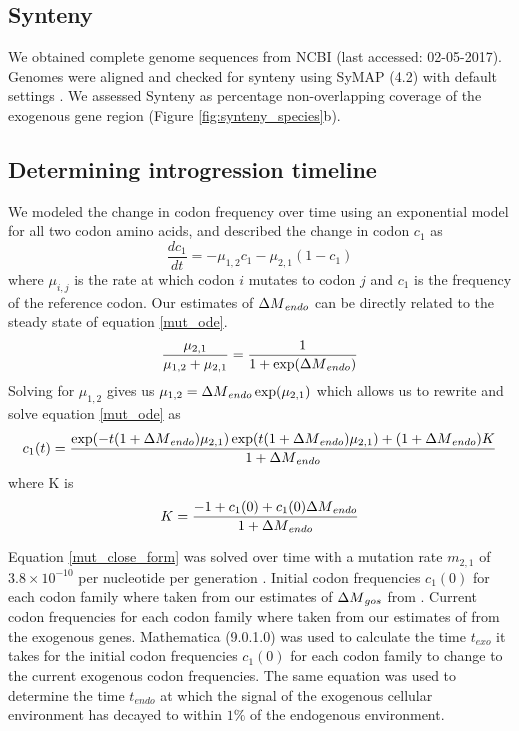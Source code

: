 \documentclass[12pt]{article}
\begin{document}
\subsection*{Synteny}
We obtained complete genome sequences from NCBI (last accessed: 02-05-2017).
Genomes were aligned and checked for synteny using SyMAP (4.2) with default settings \citep{soderlund2006, soderlund2011}.
We assessed Synteny as percentage non-overlapping coverage of the exogenous gene region (Figure \ref{fig:synteny_species}b).

\subsection*{Determining introgression timeline}
We modeled the change in codon frequency over time using an exponential model for all two codon amino acids, and described the change in codon $c_1$ as
\begin{equation}
\frac{d c_1}{d t} = -\mu_{1,2}c_1 - \mu_{2,1}(1-c_1)
\label{mut_ode}
\end{equation}
where $\mu_{i,j}$ is the rate at which codon $i$ mutates to codon $j$ and $c_1$ is the frequency of the reference codon.
Our estimates of ${\Delta M}_{endo}$ can be directly related to the steady state of equation \ref{mut_ode}.
\begin{equation}
\frac{\mu_{2,1}}{\mu_{1,2} + \mu_{2,1}} = \frac{1}{1+\exp({\Delta M}_{endo})}
\end{equation}
Solving for $\mu_{1,2}$ gives us $\mu_{1,2} = {\Delta M}_{endo}\exp(\mu_{2,1})$ which allows us to rewrite and solve equation \ref{mut_ode} as
\begin{equation}
c_1(t) = \frac{\exp(-t(1+{\Delta M}_{endo})\mu_{2,1})\exp(t(1+{\Delta M}_{endo})\mu_{2,1}) + (1+{\Delta M}_{endo})K}{1+{\Delta M}_{endo}}
\label{mut_close_form}
\end{equation}
where K is
\begin{equation}
K = \frac{-1 + c_1(0) + c_1(0){\Delta M}_{endo}}{1+{\Delta M}_{endo}}
\end{equation}

Equation \ref{mut_close_form} was solved over time with a mutation rate $m_{2,1}$ of $3.8\times 10^{-10}$ per nucleotide per generation \citep{lang2008}. 
Initial codon frequencies $c_1(0)$ for each codon family where taken from our estimates of ${\Delta M}_{gos}$ from \gossypii. 
Current codon frequencies for each codon family where taken from our estimates of \DM from the exogenous genes.
Mathematica (9.0.1.0) \citep{Mathematica} was used to calculate the time $t_{exo}$ it takes for the initial codon frequencies $c_1(0)$ for each codon family to change to the current exogenous codon frequencies.
The same equation was used to determine the time $t_{endo}$ at which the signal of the exogenous cellular environment has decayed to within $1 \%$ of the endogenous environment.
\end{document}
